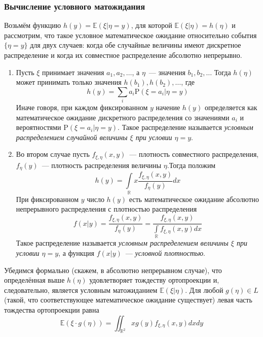 \documentclass[oneside,final,14pt]{extreport}
\theoremstyle{definition}
\begin{document}
\subsubsection{Вычисление условного матожидания}
Возьмём функцию $h(y)=\mathbb{E}(\xi | \eta=y)$, для которой $\mathbb{E}(\xi | \eta)=h(\eta)$ и рассмотрим, что такое условное математическое ожидание относительно события $\{\eta=y\}$ для двух случаев: когда обе случайные величины имеют дискретное распределение и когда их совместное распределение абсолютно непрерывно.
\begin{enumerate}
    \item Пусть $\xi$ принимает значения $a_{1}, a_{2}, \ldots$, а $\eta$~--- значения $b_{1}, b_{2}, \ldots$ Тогда $h(\eta)$ может принимать только значения $h\left(b_{1}\right), h\left(b_{2}\right), \ldots$, где
    \begin{equation*}
        h(y)=\sum_{i} a_{i} \mathrm{P}\left(\xi=a_{i} | \eta=y\right)
    \end{equation*}
    Иначе говоря, при каждом фиксированном $y$ начение $h(y)$ определяется как математическое ожидание дискретного распределения со значениями $a_{i}$ и вероятностями $\mathrm{P}\left(\xi=a_{i} | \eta=y\right)$. Такое распределение называется {\it условным распределением случайной величины $\xi$ при условии $\eta = y$}.
    
    \item Во втором случае пусть $f_{\xi, \eta}(x, y)$~--- плотность совместного распределения, $f_{\eta}(y)$~--- плотность распределения величины $\eta$.Тогда положим
    \begin{equation*}
        h(y)=\int\limits_{\mathbb{R}} x \frac{f_{\xi, \eta}(x, y)}{f_{\eta}(y)} d x
    \end{equation*}
    При фиксированном $y$ число $h(y)$ есть математическое ожидание абсолютно непрерывного распределения с плотностью распределения
    \begin{equation*}
        f(x | y)=\frac{f_{\xi, \eta}(x, y)}{f_{\eta}(y)}=\frac{f_{\xi, \eta}(x, y)}{\int\limits_{\mathbb{R}} f_{\xi, \eta}(x, y) d x}
    \end{equation*}
    Такое распределение называется {\it условным распределением величины $\xi$ при условии $\eta = y$}, а функция $f(x | y)$~--- {\it условной плотностью}.
\end{enumerate}

    Убедимся формально (скажем, в абсолютно непрерывном случае), что определённая выше $h(\eta)$ удовлетворяет тождеству ортопроекции и, следовательно, является условным матожиданием $\mathbb{E}(\xi | \eta)$. Для любой $g(\eta) \in L$ (такой, что соответствующее математическое ожидание существует) левая часть тождества ортопроекции равна
    \begin{equation*}
        \mathbb{E}(\xi \cdot g(\eta))=\iint_{\mathbb{R}^{2}} x g(y) f_{\xi, \eta}(x, y) d x d y
    \end{equation*}
    
\end{document}
